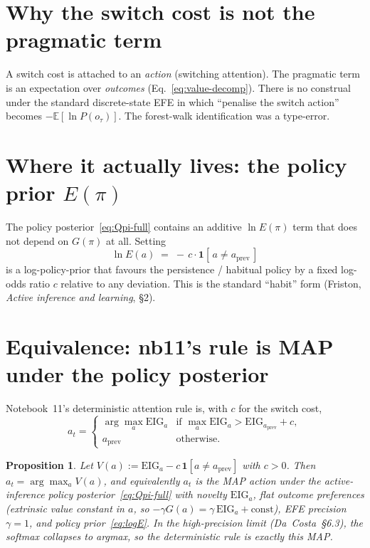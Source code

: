 \documentclass[11pt,a4paper]{article}
\theoremstyle{plain}
\newtheorem{proposition}{Proposition}
\begin{document}
\section{Why the switch cost is not the pragmatic term}

A switch cost is attached to an \emph{action} (switching attention).
The pragmatic term is an expectation over \emph{outcomes}
(Eq.~\eqref{eq:value-decomp}). There is no construal under the standard
discrete-state EFE in which ``penalise the switch action'' becomes
$-\mathbb{E}[\ln P(o_\tau)]$. The forest-walk identification was a
type-error.

\section{Where it actually lives: the policy prior $E(\pi)$}

The policy posterior~\eqref{eq:Qpi-full} contains an additive
$\ln E(\pi)$ term that does not depend on $G(\pi)$ at all. Setting
\begin{equation}
\ln E(a) \;=\; -\,c \cdot \mathbf{1}[\,a \neq a_{\mathrm{prev}}\,]
\label{eq:logE}
\end{equation}
is a log-policy-prior that favours the persistence / habitual policy by
a fixed log-odds ratio $c$ relative to any deviation. This is the
standard ``habit'' form (Friston, \emph{Active inference and learning},
\S2).

\section{Equivalence: nb11's rule is MAP under the policy posterior}

Notebook~11's deterministic attention rule is, with $c$ for the switch
cost,
\begin{equation*}
a_t = \begin{cases}
\arg\max_a \mathrm{EIG}_a & \text{if } \max_a\mathrm{EIG}_a > \mathrm{EIG}_{a_{\mathrm{prev}}} + c,\\
a_{\mathrm{prev}} & \text{otherwise.}
\end{cases}
\end{equation*}

\begin{proposition}
Let $V(a) := \mathrm{EIG}_a - c\,\mathbf{1}[a\neq a_{\mathrm{prev}}]$
with $c>0$. Then $a_t = \arg\max_a V(a)$, and equivalently $a_t$ is the
MAP action under the active-inference policy
posterior~\eqref{eq:Qpi-full} with novelty $\mathrm{EIG}_a$, flat
outcome preferences (extrinsic value constant in $a$, so
$-\gamma G(a) = \gamma\,\mathrm{EIG}_a + \text{const}$), EFE precision
$\gamma=1$, and policy prior~\eqref{eq:logE}. In the high-precision
limit (Da~Costa~\S6.3), the softmax collapses to argmax, so the
deterministic rule is exactly this MAP.
\end{proposition}
\end{document}
